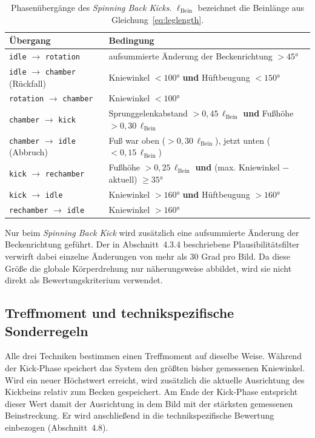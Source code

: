 \documentclass[intern]{cgMA}
\begin{document}
\begin{table}[htbp]
\centering
\begin{tabular}{p{} p{}}
\hline
\textbf{Übergang} & \textbf{Bedingung} \\ \hline
\texttt{idle} $\rightarrow$ \texttt{rotation} & aufsummierte Änderung der Beckenrichtung $>45°$ \\
\texttt{idle} $\rightarrow$ \texttt{chamber} (Rückfall) & Kniewinkel $<100°$ \textbf{und} Hüftbeugung $<150°$ \\
\texttt{rotation} $\rightarrow$ \texttt{chamber} & Kniewinkel $<100°$ \\
\texttt{chamber} $\rightarrow$ \texttt{kick} & Sprunggelenkabstand $>0{,}45\,\ell_{\text{Bein}}$ \textbf{und} Fußhöhe $>0{,}30\,\ell_{\text{Bein}}$ \\
\texttt{chamber} $\rightarrow$ \texttt{idle} (Abbruch) & Fuß war oben ($>0{,}30\,\ell_{\text{Bein}}$), jetzt unten ($<0{,}15\,\ell_{\text{Bein}}$) \\
\texttt{kick} $\rightarrow$ \texttt{rechamber} & Fußhöhe $>0{,}25\,\ell_{\text{Bein}}$ \textbf{und} (max. Kniewinkel $-$ aktuell) $\geq35°$ \\
\texttt{kick} $\rightarrow$ \texttt{idle} & Kniewinkel $>160°$ \textbf{und} Hüftbeugung $>160°$ \\
\texttt{rechamber} $\rightarrow$ \texttt{idle} & Kniewinkel $>160°$ \\ \hline
\end{tabular}
\caption{Phasenübergänge des \textit{Spinning Back Kicks}. $\ell_{\text{Bein}}$ bezeichnet die Beinlänge aus Gleichung~\ref{eq:leglength}.}
\label{tab:transitions_dwit}
\end{table}

Nur beim \textit{Spinning Back Kick} wird zusätzlich eine aufsummierte Änderung der Beckenrichtung geführt. Der in Abschnitt~4.3.4 beschriebene Plausibilitätsfilter verwirft dabei einzelne Änderungen von mehr als 30 Grad pro Bild. Da diese Größe die globale Körperdrehung nur näherungsweise abbildet, wird sie nicht direkt als Bewertungskriterium verwendet.

\subsection{Treffmoment und technikspezifische Sonderregeln}
Alle drei Techniken bestimmen einen Treffmoment auf dieselbe Weise. Während der Kick-Phase speichert das System den größten bisher gemessenen Kniewinkel. Wird ein neuer Höchstwert erreicht, wird zusätzlich die aktuelle Ausrichtung des Kickbeins relativ zum Becken gespeichert. Am Ende der Kick-Phase entspricht dieser Wert damit der Ausrichtung in dem Bild mit der stärksten gemessenen Beinstreckung. Er wird anschließend in die technikspezifische Bewertung einbezogen (Abschnitt~4.8).
\end{document}
